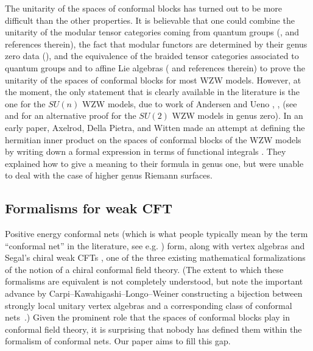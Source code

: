 \documentclass[a4paper,10pt,leqno]{amsart}
\theoremstyle{plain}
\theoremstyle{definition}
\theoremstyle{remark}
\DeclareRobustCommand{\SkipTocEntry}[5]{}
\begin{document}
The unitarity of the spaces of conformal blocks has turned out to be more difficult than the other properties.
It is believable that one could combine the unitarity of the modular tensor categories coming from quantum groups (\cite{wenzl-cstar}, \cite[Sec.4]{Rowell(From-quantum-groups-to-UMTC)} and references therein), the fact that modular functors are determined by their genus zero data (\cite{Andersen-Ueno(Modular-functors-determined-genus-zero)}),
and the equivalence of the braided tensor categories associated to quantum groups and to affine Lie algebras (\cite[Sec.3]{Huang-Lepowsky(Tensor-categories-and-the-mathematics-of-rational-and-logarithmic-conformal-field-theory)} and references therein) to prove the unitarity of the spaces of conformal blocks for most WZW models.
However, at the moment, the only statement that is clearly available in the literature is the one for the $SU(n)$ WZW models, due to work of Andersen and Ueno \cite{Andersen-Ueno(Abelian-CFT+det-bundles)}, \cite{Andersen-Ueno(Geometric-constr-modular-functors)}, \cite{Andersen-Ueno(Reshetikhin-Turaev-from-CFT)} (see \cite{Ramadas(The-Harder-Narasimhan-trace-and-unitarity-of-the-KZ/Hitchin-connection:-genus-0)} and \cite{Looijenga(Unitarity-of-SL(2)-conformal-blocks-in-genus-zero)} for an alternative proof for the $SU(2)$ WZW models in genus zero).
In an early paper, Axelrod, Della Pietra, and Witten made an attempt at defining the hermitian inner product on the spaces of conformal blocks of the WZW models by writing down a formal expression in terms of functional integrals \cite{Axelrod-DellaPietra-Witten}.
They explained how to give a meaning to their formula in genus one, but were unable to deal with the case of higher genus Riemann surfaces.

\subsection*{Formalisms for weak CFT}
Positive energy conformal nets \cite[Def.~4.5]{BDH(nets)} (which is what people typically mean by the term ``conformal net'' in the literature, see e.g. \cite{Longo(Lectures-on-Nets-II)})
form, along with vertex algebras and Segal's chiral weak CFTs \cite[Def.~5.2]{Segal(Def-CFT)},
one of the three existing mathematical formalizations of the notion of a chiral conformal field theory. (The extent to which these formalisms are equivalent is not completely understood, but note the important advance by Carpi--Kawahigashi--Longo--Weiner constructing a bijection between strongly local unitary vertex algebras and a corresponding class of conformal nets~\cite{cklw}.)
Given the prominent role that the spaces of conformal blocks play in conformal field theory, 
it is surprising that nobody has defined them within the formalism of conformal nets.
Our paper aims to fill this gap.
\end{document}
